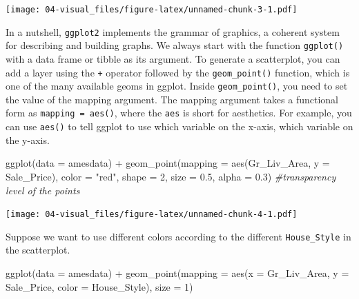 \documentclass[
]{book}
\newenvironment{Shaded}{\begin{snugshade}}{\end{snugshade}}
\newcommand{\AttributeTok}[1]{\textcolor[rgb]{0.77,0.63,0.00}{#1}}
\newcommand{\CommentTok}[1]{\textcolor[rgb]{0.56,0.35,0.01}{\textit{#1}}}
\newcommand{\DecValTok}[1]{\textcolor[rgb]{0.00,0.00,0.81}{#1}}
\newcommand{\FloatTok}[1]{\textcolor[rgb]{0.00,0.00,0.81}{#1}}
\newcommand{\FunctionTok}[1]{\textcolor[rgb]{0.00,0.00,0.00}{#1}}
\newcommand{\NormalTok}[1]{#1}
\newcommand{\SpecialCharTok}[1]{\textcolor[rgb]{0.00,0.00,0.00}{#1}}
\newcommand{\StringTok}[1]{\textcolor[rgb]{0.31,0.60,0.02}{#1}}
\theoremstyle{definition}
\theoremstyle{definition}
\theoremstyle{definition}
\theoremstyle{definition}
\theoremstyle{remark}
\begin{document}
\texttt{[image: 04-visual\_files/figure-latex/unnamed-chunk-3-1.pdf]}

In a nutshell, \texttt{ggplot2} implements the grammar of graphics, a coherent system for describing and building graphs. We always start with the function \texttt{ggplot()} with a data frame or tibble as its argument. To generate a scatterplot, you can add a layer using the \texttt{+} operator followed by the \texttt{geom\_point()} function, which is one of the many available geoms in ggplot. Inside \texttt{geom\_point()}, you need to set the value of the mapping argument. The mapping argument takes a functional form as \texttt{mapping\ =\ aes()}, where the \texttt{aes} is short for aesthetics. For example, you can use \texttt{aes()} to tell ggplot to use which variable on the x-axis, which variable on the y-axis.

\begin{Shaded}
\begin{Highlighting}[]
\FunctionTok{ggplot}\NormalTok{(}\AttributeTok{data =}\NormalTok{ amesdata) }\SpecialCharTok{+} 
  \FunctionTok{geom\_point}\NormalTok{(}\AttributeTok{mapping =} \FunctionTok{aes}\NormalTok{(Gr\_Liv\_Area, }\AttributeTok{y =}\NormalTok{ Sale\_Price), }
             \AttributeTok{color =} \StringTok{"red"}\NormalTok{,}
             \AttributeTok{shape =} \DecValTok{2}\NormalTok{,}
             \AttributeTok{size =} \FloatTok{0.5}\NormalTok{,}
             \AttributeTok{alpha =} \FloatTok{0.3}\NormalTok{) }\CommentTok{\#transparency level of the points}
\end{Highlighting}
\end{Shaded}

\texttt{[image: 04-visual\_files/figure-latex/unnamed-chunk-4-1.pdf]}

Suppose we want to use different colors according to the different \texttt{House\_Style} in the scatterplot.

\begin{Shaded}
\begin{Highlighting}[]
\FunctionTok{ggplot}\NormalTok{(}\AttributeTok{data =}\NormalTok{ amesdata) }\SpecialCharTok{+} 
  \FunctionTok{geom\_point}\NormalTok{(}\AttributeTok{mapping =} \FunctionTok{aes}\NormalTok{(}\AttributeTok{x =}\NormalTok{ Gr\_Liv\_Area, }
                           \AttributeTok{y =}\NormalTok{ Sale\_Price, }
                           \AttributeTok{color =}\NormalTok{ House\_Style), }
             \AttributeTok{size =} \DecValTok{1}\NormalTok{)}
\end{Highlighting}
\end{Shaded}
\end{document}
